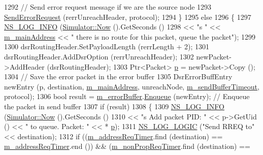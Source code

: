 \begin{DoxyCode}
1292         \textcolor{comment}{// Send error request message if we are the source node}
1293         \hyperlink{classns3_1_1dsr_1_1DsrRouting_ae2100978eb9447540ceceeda17e95cea}{SendErrorRequest} (rerrUnreachHeader, protocol);
1294       \}
1295       \textcolor{keywordflow}{else} 
1296       \{
1297         \hyperlink{group__logging_gafbd73ee2cf9f26b319f49086d8e860fb}{NS\_LOG\_INFO} (\hyperlink{classns3_1_1Simulator_ac3178fa975b419f7875e7105be122800}{Simulator::Now} ().GetSeconds ()
1298                      << \textcolor{stringliteral}{"s "} << \hyperlink{classns3_1_1dsr_1_1DsrRouting_a73182b5edee2d8460f28855e058fc9a0}{m\_mainAddress} << \textcolor{stringliteral}{" there is no route for this packet, queue
       the packet"});
1299 
1300         dsrRoutingHeader.SetPayloadLength (rerrLength + 2);
1301         dsrRoutingHeader.AddDsrOption (rerrUnreachHeader);
1302         newPacket->AddHeader (dsrRoutingHeader);
1303         Ptr<Packet> \hyperlink{lte__link__budget_8m_ac9de518908a968428863f829398a4e62}{p} = newPacket->Copy ();
1304         \textcolor{comment}{// Save the error packet in the error buffer}
1305         DsrErrorBuffEntry newEntry (p, destination, \hyperlink{classns3_1_1dsr_1_1DsrRouting_a73182b5edee2d8460f28855e058fc9a0}{m\_mainAddress}, unreachNode, 
      \hyperlink{classns3_1_1dsr_1_1DsrRouting_a1f89794801db0336d92e4ca85fbc09a7}{m\_sendBufferTimeout}, protocol);
1306         \textcolor{keywordtype}{bool} result = \hyperlink{classns3_1_1dsr_1_1DsrRouting_a802e15bf588fd1e9ccd401221461397a}{m\_errorBuffer}.\hyperlink{classns3_1_1dsr_1_1DsrErrorBuffer_a509601131629af3b0b4881f88d9b672e}{Enqueue} (newEntry);                    \textcolor{comment}{// Enqueue
       the packet in send buffer}
1307         \textcolor{keywordflow}{if} (result)
1308           \{
1309             \hyperlink{group__logging_gafbd73ee2cf9f26b319f49086d8e860fb}{NS\_LOG\_INFO} (\hyperlink{classns3_1_1Simulator_ac3178fa975b419f7875e7105be122800}{Simulator::Now} ().GetSeconds ()
1310                          << \textcolor{stringliteral}{"s Add packet PID: "} << p->GetUid () << \textcolor{stringliteral}{" to queue. Packet: "} << *
      \hyperlink{lte__link__budget_8m_ac9de518908a968428863f829398a4e62}{p});
1311             \hyperlink{group__logging_ga88acd260151caf2db9c0fc84997f45ce}{NS\_LOG\_LOGIC} (\textcolor{stringliteral}{"Send RREQ to"} << destination);
1312             \textcolor{keywordflow}{if} ((\hyperlink{classns3_1_1dsr_1_1DsrRouting_a47174823b0622573b681afc40d6ea558}{m\_addressReqTimer}.find (destination) == 
      \hyperlink{classns3_1_1dsr_1_1DsrRouting_a47174823b0622573b681afc40d6ea558}{m\_addressReqTimer}.end ()) && (\hyperlink{classns3_1_1dsr_1_1DsrRouting_a0936df610f90f7e79c24a2a8cdea6c14}{m\_nonPropReqTimer}.find (destination) == 

\end{DoxyCode}
